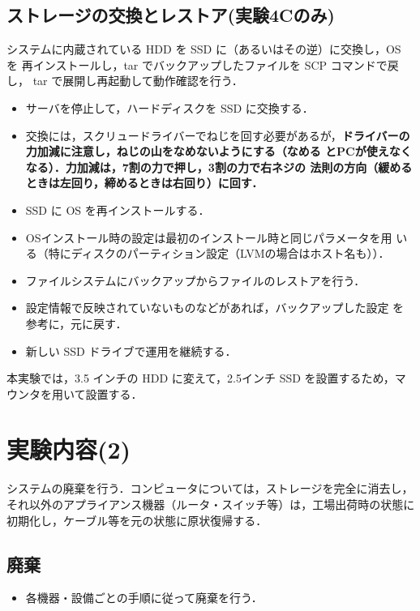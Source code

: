 \subsection*{ストレージの交換とレストア(実験4Cのみ)}

システムに内蔵されている HDD を SSD に（あるいはその逆）に交換し，OS を
再インストールし，tar でバックアップしたファイルを SCP コマンドで戻し，
tar で展開し再起動して動作確認を行う．

\begin{itemize}
 \item サーバを停止して，ハードディスクを SSD に交換する．
 \item 交換には，スクリュードライバーでねじを回す必要があるが，\textbf
       {ドライバーの力加減に注意し，ねじの山をなめないようにする（なめる
       とPCが使えなくなる）．力加減は，7割の力で押し，3割の力で右ネジの
       法則の方向（緩めるときは左回り，締めるときは右回り）に回す．}
 \item SSD に OS を再インストールする．
 \item OSインストール時の設定は最初のインストール時と同じパラメータを用
       いる（特にディスクのパーティション設定（LVMの場合はホスト名も））．
 \item ファイルシステムにバックアップからファイルのレストアを行う．
 \item 設定情報で反映されていないものなどがあれば，バックアップした設定
       を参考に，元に戻す．
 \item 新しい SSD ドライブで運用を継続する．
\end{itemize}
本実験では，3.5 インチの HDD に変えて，2.5インチ SSD を設置するため，マ
ウンタを用いて設置する．

\section{実験内容(2)}

システムの廃棄を行う．コンピュータについては，ストレージを完全に消去し，
それ以外のアプライアンス機器（ルータ・スイッチ等）は，工場出荷時の状態に
初期化し，ケーブル等を元の状態に原状復帰する．

\subsection*{廃棄}
 \begin{itemize}
  \item 各機器・設備ごとの手順に従って廃棄を行う．
 \end{itemize}

